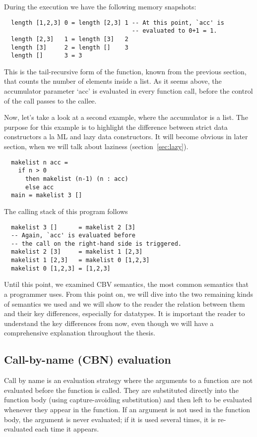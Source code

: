\documentclass[diploma]{softlab-thesis}
\begin{document}
During the execution we have the following memory snapshots:
\begin{verbatim}
  length [1,2,3] 0 = length [2,3] 1 -- At this point, `acc' is 
                                    -- evaluated to 0+1 = 1.
  length [2,3]   1 = length [3]   2
  length [3]     2 = length []    3
  length []      3 = 3
\end{verbatim}

This is the tail-recursive form of the function, known from the previous section, that counts the number 
of elements inside a list. As it seems above, the accumulator parameter `acc' is evaluated in every 
function call, before the control of the call passes to the callee.

Now, let's take a look at a second example, where the accumulator is a list. The purpose for this 
example is to highlight the difference between strict data constructors a la ML and lazy data constructors.
It will become obvious in later section, when we will talk about laziness (section~\ref{sec:lazy}).

\begin{verbatim}
  makelist n acc = 
    if n > 0 
      then makelist (n-1) (n : acc)
      else acc
  main = makelist 3 []
\end{verbatim}

The calling stack of this program follows
\begin{verbatim}
  makelist 3 []      = makelist 2 [3] 
  -- Again, `acc' is evaluated before 
  -- the call on the right-hand side is triggered.
  makelist 2 [3]     = makelist 1 [2,3]
  makelist 1 [2,3]   = makelist 0 [1,2,3]
  makelist 0 [1,2,3] = [1,2,3]
\end{verbatim}

Until this point, we examined CBV semantics, the most common 
semantics that a programmer uses. From this point on, we will dive into 
the two remaining kinds of semantics we used and we will show to the reader 
the relation between them and their key differences, especially for datatypes.
It is important the reader to understand the key differences from now, even though 
we will have a comprehensive explanation throughout the thesis.

\subsection {Call-by-name (CBN) evaluation}
\label{sec:cbn}

Call by name is an evaluation strategy where the arguments to a function are not evaluated before the function is called. 
They are substituted directly into the function body (using capture-avoiding substitution) and then left to be evaluated 
whenever they appear in the function. If an argument is not used in the function body, the argument is never evaluated; 
if it is used several times, it is re-evaluated each time it appears.
\end{document}
